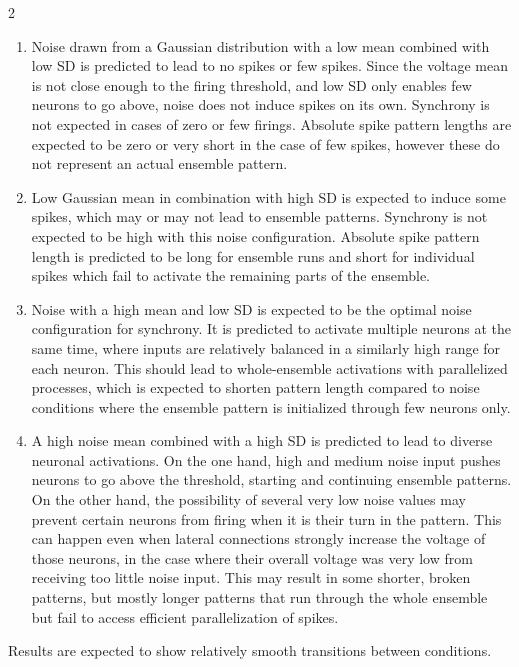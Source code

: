 \documentclass[12pt,a4paper]{article}
\begin{document}
\begin{multicols}{2}
           \begin{enumerate}[label=\alph*), labelwidth=1.5em, labelsep=1.5pt, leftmargin=1em, itemindent=0pt, rightmargin=0pt, itemsep=5pt, parsep=0pt, topsep=2pt, partopsep=0pt]
                \item\label{pred1}Noise drawn from a Gaussian distribution with a low mean combined with low SD is predicted to lead to no spikes or few spikes. Since the voltage mean is not close enough to the firing threshold, and low SD only enables few neurons to go above, noise does not induce spikes on its own. Synchrony is not expected in cases of zero or few firings. Absolute spike pattern lengths are expected to be zero or very short in the case of few spikes, however these do not represent an actual ensemble pattern.
                \item\label{pred2}Low Gaussian mean in combination with high SD is expected to induce some spikes, which may or may not lead to ensemble patterns. Synchrony is not expected to be high with this noise configuration. Absolute spike pattern length is predicted to be long for ensemble runs and short for individual spikes which fail to activate the remaining parts of the ensemble.
                \item\label{pred3}Noise with a high mean and low SD is expected to be the optimal noise configuration for synchrony. It is predicted to activate multiple neurons at the same time, where inputs are relatively balanced in a similarly high range for each neuron. This should lead to whole-ensemble activations with parallelized processes, which is expected to shorten pattern length compared to noise conditions where the ensemble pattern is initialized through few neurons only.
                \item\label{pred4}A high noise mean combined with a high SD is predicted to lead to diverse neuronal activations. On the one hand, high and medium noise input pushes neurons to go above the threshold, starting and continuing ensemble patterns. On the other hand, the possibility of several very low noise values may prevent certain neurons from firing when it is their turn in the pattern. This can happen even when lateral connections strongly increase the voltage of those neurons, in the case where their overall voltage was very low from receiving too little noise input. This may result in some shorter, broken patterns, but mostly longer patterns that run through the whole ensemble but fail to access efficient parallelization of spikes.
            \end{enumerate}
            Results are expected to show relatively smooth transitions between conditions.
            

\end{multicols}
\end{document}
